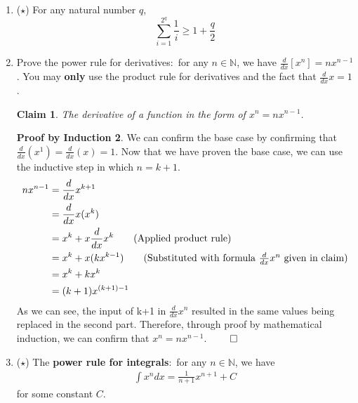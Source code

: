 \documentclass[11pt]{letter}
\newtheorem{claim}{Claim}
\theoremstyle{definition}
\newtheorem{PBI}{Proof by Induction}
\begin{document}
\begin{description}
\begin{enumerate}
\begin{PBI}
\begin{align*}
&2^{n+1}\\
&2(2^{n}) \\
\end{align*}
Since the amount of flips will be twice the previous amount, as you can do all of the previous flip possibilities on heads and again on tails, this confirms that $2^n$ accurately describes the probability of heads and tails through Mathemartical Induction, we must conclude that given $n$ coin tosses, there are a total of $2^n$ possibilities. $\qed$
\end{PBI}
			\item ($\star$) For any natural number $q$, $$\sum_{i=1}^{2^q}\frac{1}{i}\geq 1+\frac{q}{2}$$
			\item Prove the power rule for derivatives:~for any $n\in\mathbb{N}$, we have $\frac{d}{dx}[x^n]=nx^{n-1}$. You may {\bfseries only} use the product rule for derivatives and the fact that $\frac{d}{dx}x=1$.
\begin{claim}
	The derivative of a function in the form of $x^n=nx^{n-1}$.
\end{claim}
\begin{PBI}
We can confirm the base case by confirming that $\frac{d}{dx}(x^1)=\frac{d}{dx}(x)=1$. Now that we have proven the base case, we can use the inductive step in which $n=k+1$. \\
\begin{align*}
nx^{n-1}&=\frac{d}{dx}x^{k+1}\\
&= \frac{d}{dx}x(x^k) \\
&= x^k+x\frac{d}{dx}x^k  \tag{Applied product rule} \\
&= x^k+x(kx^{k-1}) \tag{Substituted with formula $\frac{d}{dx}x^n$ given in claim} \\
&= x^k+kx^k \\
&= (k+1)x^{(k+1)-1} \\
\end{align*}
As we can see, the input of k+1 in $\frac{d}{dx}x^{n}$ resulted in the same values being replaced in the second part. Therefore, through proof by mathematical induction, we can confirm that $x^n=nx^{n-1}$. $\qed$
\end{PBI}
			 \item ($\star$) The {\bfseries power rule for integrals}:~for any $n\in\mathbb{N}$, we have 
				\begin{align*}
					\int x^ndx=\frac{1}{n+1}x^{n+1}+C
				\end{align*}
				for some constant $C$.\\

\end{enumerate}
\end{description}
\end{document}

